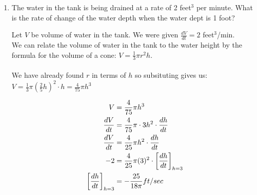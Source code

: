 \documentclass[nooutcomes]{ximera}
\begin{document}
\begin{problem}
\begin{enumerate}
	\item The water in the tank is being drained at a rate of 2 feet$^3$ per minute.  What is the rate of change of the water depth when the water dept is 1 foot?

	\begin{freeResponse}
	Let $V$ be volume of water in the tank.  We were given $\frac{dV}{dt}=2$ feet$^3$/min. \\
	We can relate the volume of water in the tank to the water height by the formula for the volume of a cone: $V=\frac{1}{3}\pi r^2 h$. \\\\
	We have already found $r$ in terms of $h$ so subsituting gives us:  $V=\frac{1}{3}\pi \left(\frac{2}{5}h\right)^2\cdot h=\frac{4}{75}\pi h^3$
	
	\begin{align*}
	V&=\frac{4}{75}\pi h^3\\
	\frac{dV}{dt}&=\frac{4}{75}\pi \cdot 3h^2 \cdot \frac{dh}{dt} \\
	\frac{dV}{dt}&=\frac{4}{25}\pi h^2 \cdot \frac{dh}{dt} \\
	-2&=\frac{4}{25}\pi (3)^2 \cdot \bigg[ \frac{dh}{dt} \bigg]_{h=3} \\
	\bigg[ \frac{dh}{dt} \bigg]_{h=3}&=-\frac{25}{18 \pi} ft/sec
	\end{align*}


\end{freeResponse}
\end{enumerate}
\end{problem}
\end{document}
